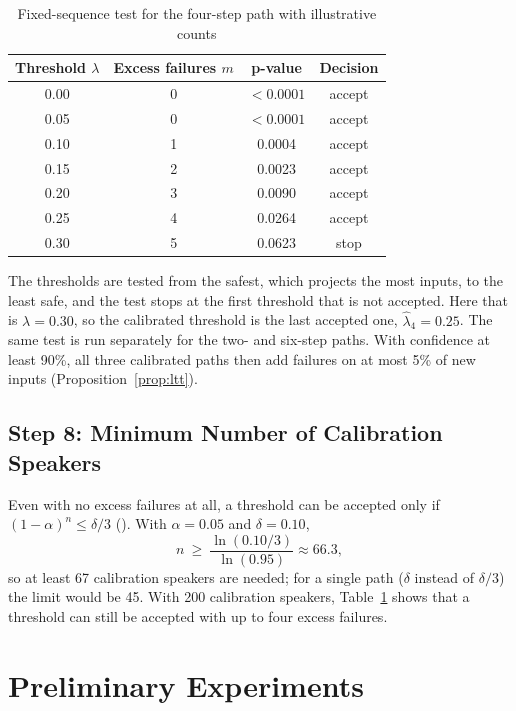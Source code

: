 \begin{table}[!htbp]
\centering\small
\caption{Fixed-sequence test for the four-step path with illustrative counts}
\label{tab:app-ltt}
\begin{tabular}{@{}c c c c@{}}
\toprule
\textbf{Threshold $\lambda$} & \textbf{Excess failures $m$} & \textbf{p-value} & \textbf{Decision} \\
\midrule
0.00 & 0 & $<0.0001$ & accept \\
0.05 & 0 & $<0.0001$ & accept \\
0.10 & 1 & 0.0004 & accept \\
0.15 & 2 & 0.0023 & accept \\
0.20 & 3 & 0.0090 & accept \\
0.25 & 4 & 0.0264 & accept \\
0.30 & 5 & 0.0623 & stop \\
\bottomrule
\end{tabular}
\end{table}

The thresholds are tested from the safest, which projects the most inputs, to the least safe, and the test stops at the first threshold that is not accepted. Here that is $\lambda=0.30$, so the calibrated threshold is the last accepted one, $\hat\lambda_4=0.25$. The same test is run separately for the two- and six-step paths. With confidence at least 90\%, all three calibrated paths then add failures on at most 5\% of new inputs (Proposition~\ref{prop:ltt}).

\subsection{Step 8: Minimum Number of Calibration Speakers}
\label{app:calc-size}

Even with no excess failures at all, a threshold can be accepted only if $(1-\alpha)^n\le\delta/3$ (). With $\alpha=0.05$ and $\delta=0.10$,
\[
n \ \ge\ \frac{\ln(0.10/3)}{\ln(0.95)} \approx 66.3,
\]
so at least 67 calibration speakers are needed; for a single path ($\delta$ instead of $\delta/3$) the limit would be 45. With 200 calibration speakers, Table~\ref{tab:app-ltt} shows that a threshold can still be accepted with up to four excess failures.

\FloatBarrier

\section[APPENDIX B.\ PRELIMINARY EXPERIMENTS]{Preliminary Experiments}
\label{app:prelim}

